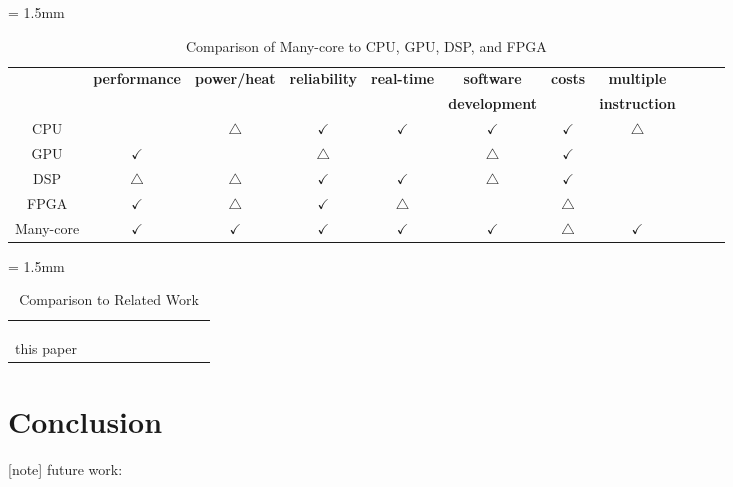\documentclass{sig-alternate-05-2015}
\begin{document}
\renewcommand{\arraystretch}{2.0}
\begin{table}[t]
  \caption{\label{tb:comparison_manu-core}
    Comparison of Many-core to CPU, GPU, DSP, and FPGA}
  \centering
  \scriptsize	                    %
  \tabcolsep = 1.5mm              %
  \begin{tabular}{c|cccccccccc}
    \hline
    & \multirow{2}{*}{\textbf{performance}} & \multirow{2}{*}{\textbf{power/heat}} & \multirow{2}{*}{\textbf{reliability}} & \multirow{2}{*}{\textbf{real-time}} & \textbf{software} & \multirow{2}{*}{\textbf{costs}} & \textbf{multiple}\\
    &&&&& \textbf{development} && \textbf{instruction} \\
    \hline
    \hline
    CPU & & \(\bigtriangleup\) & \(\checkmark\) & \(\checkmark\) & \(\checkmark\) & \(\checkmark\) & \(\bigtriangleup\) \\
    GPU & \(\checkmark\) &  & \(\bigtriangleup\) &  & \(\bigtriangleup\) & \(\checkmark\)\\
    DSP & \(\bigtriangleup\) & \(\bigtriangleup\) & \(\checkmark\) & \(\checkmark\) & \(\bigtriangleup\) & \(\checkmark\) & \\
    FPGA & \(\checkmark\) & \(\bigtriangleup\) & \(\checkmark\) & \(\bigtriangleup\) &  & \(\bigtriangleup\) & \\
    Many-core & \(\checkmark\) & \(\checkmark\) & \(\checkmark\) & \(\checkmark\) & \(\checkmark\) & \(\bigtriangleup\) & \(\checkmark\) \\
    \hline
  \end{tabular}
  \vspace{-5mm}
\end{table}


\renewcommand{\arraystretch}{2.0}
\begin{table}[t]
  \caption{\label{tb:comparison_relatedwork}
    Comparison to Related Work}
  \centering
  \scriptsize	                    %
  \tabcolsep = 1.5mm              %
  \begin{tabular}{c|ccccccccc}
    \hline
    &  &  &  &  &  & \\
    \hline
    \hline
    \cite{saidi2015shift} &  &  &  &  &  & \\
    \cite{perret2016mapping} &  &  &  &  &  & \\
    \cite{becker2016contention} &  &  &  &  &  & \\
    this paper &  &  &  &  &  & \\
    \hline
  \end{tabular}
  \vspace{-5mm}
\end{table}


\section{Conclusion}
\label{sec:conclusion}

[note]
future work: \cite{maruyama2016ros2}



\end{document}
